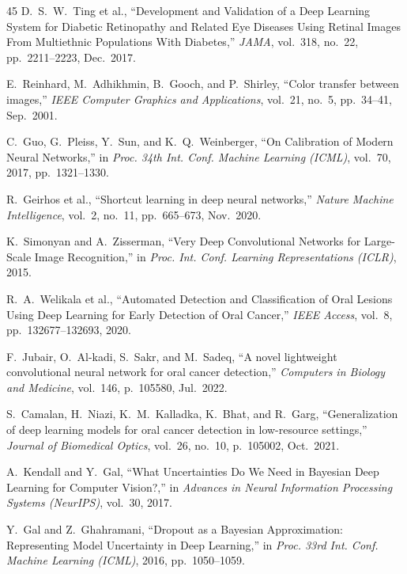 \documentclass[12pt,a4paper,oneside]{report}
\begin{document}
\begin{thebibliography}{45}
D.~S.~W.~Ting et al., ``Development and Validation of a Deep Learning System for Diabetic Retinopathy and Related Eye Diseases Using Retinal Images From Multiethnic Populations With Diabetes,'' \textit{JAMA}, vol.~318, no.~22, pp.~2211--2223, Dec.~2017.

E.~Reinhard, M.~Adhikhmin, B.~Gooch, and P.~Shirley, ``Color transfer between images,'' \textit{IEEE Computer Graphics and Applications}, vol.~21, no.~5, pp.~34--41, Sep.~2001.

C.~Guo, G.~Pleiss, Y.~Sun, and K.~Q.~Weinberger, ``On Calibration of Modern Neural Networks,'' in \textit{Proc. 34th Int. Conf. Machine Learning (ICML)}, vol.~70, 2017, pp.~1321--1330.

R.~Geirhos et al., ``Shortcut learning in deep neural networks,'' \textit{Nature Machine Intelligence}, vol.~2, no.~11, pp.~665--673, Nov.~2020.

K.~Simonyan and A.~Zisserman, ``Very Deep Convolutional Networks for Large-Scale Image Recognition,'' in \textit{Proc. Int. Conf. Learning Representations (ICLR)}, 2015.

R.~A.~Welikala et al., ``Automated Detection and Classification of Oral Lesions Using Deep Learning for Early Detection of Oral Cancer,'' \textit{IEEE Access}, vol.~8, pp.~132677--132693, 2020.

F.~Jubair, O.~Al-kadi, S.~Sakr, and M.~Sadeq, ``A novel lightweight convolutional neural network for oral cancer detection,'' \textit{Computers in Biology and Medicine}, vol.~146, p.~105580, Jul.~2022.

S.~Camalan, H.~Niazi, K.~M.~Kalladka, K.~Bhat, and R.~Garg, ``Generalization of deep learning models for oral cancer detection in low-resource settings,'' \textit{Journal of Biomedical Optics}, vol.~26, no.~10, p.~105002, Oct.~2021.

A.~Kendall and Y.~Gal, ``What Uncertainties Do We Need in Bayesian Deep Learning for Computer Vision?,'' in \textit{Advances in Neural Information Processing Systems (NeurIPS)}, vol.~30, 2017.

Y.~Gal and Z.~Ghahramani, ``Dropout as a Bayesian Approximation: Representing Model Uncertainty in Deep Learning,'' in \textit{Proc. 33rd Int. Conf. Machine Learning (ICML)}, 2016, pp.~1050--1059.


\end{thebibliography}
\end{document}
